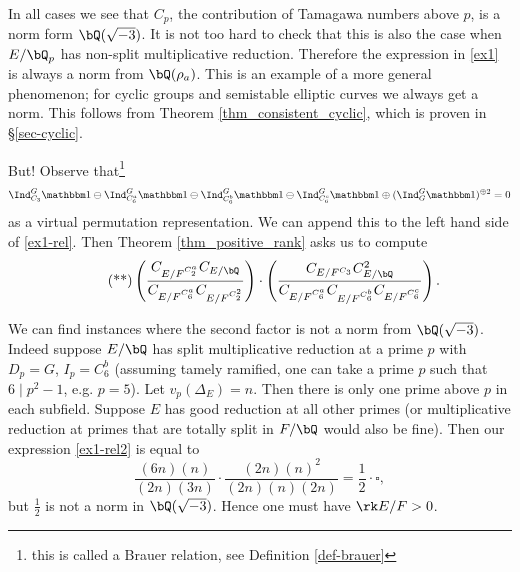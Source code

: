\begin{example}
    In all cases we see that $C_p$, the contribution of Tamagawa numbers above $p$, is a norm form $\bQ(\sqrt{-3})$. It is not too hard to check that this is also the case when $E / \bQ_p$ has non-split multiplicative reduction. Therefore the expression in \eqref{ex1} is always a norm from $\bQ(\rho_a)$. This is an example of a more general phenomenon; for cyclic groups and semistable elliptic curves we always get a norm. This follows from  Theorem \ref{thm_consistent_cyclic}, which is proven in \S\ref{sec-cyclic}.

    But! Observe that{\footnote{this is called a Brauer relation, see Definition \ref{def-brauer}}} 
    \[ \Ind_{C_3}^G \trivial \ominus \Ind_{C_6^a}^G \trivial \ominus \Ind_{C_6^b}^G \trivial \ominus \Ind_{C_6^c}^G \trivial \oplus (\Ind_G^G \trivial)^{\oplus 2} = 0 \]
    as a virtual permutation representation. We can append this to the left hand side of \eqref{ex1-rel}. Then Theorem \ref{thm_positive_rank} asks us to compute 
    \begin{equation}\label{ex1-rel2}\tag{**}
    \left(\frac{C_{E / F^{C_2^a}} C_{E / \bQ} }{C_{E / F^{C_6^a}} C_{E / F^{C_2^2}}}\right) \cdot \left( \frac{C_{E / F^{C_3}} C_{E / \bQ}^2}{C_{E / F^{C_6^a}}C_{E / F^{C_6^b}}  C_{E / F^{C_6^c}} } \right). 
    \end{equation}
    
    We can find instances where the second factor is not a norm from $\bQ(\sqrt{-3})$. Indeed suppose $E / \bQ$ has split multiplicative reduction at a prime $p$ with $D_p = G$, $I_p = C_6^b$ (assuming tamely ramified, one can take a prime $p$ such that $6 \mid p^2 - 1$, e.g. $p = 5$). Let $v_p(\Delta_E) = n$. Then there is only one prime above $p$ in each subfield. Suppose $E$ has good reduction at all other primes (or multiplicative reduction at primes that are totally split in $F / \bQ$ would also be fine).
     Then our expression \eqref{ex1-rel2} is equal to
     \[ \frac{(6n)(n)}{(2n) (3n)} \cdot \frac{(2n)(n)^2}{(2n)(n)(2n)} = \frac{1}{2} \cdot \square,\] 
     but $\frac{1}{2}$ is not a norm in $\bQ(\sqrt{-3})$. Hence one must have $\rk E / F > 0$. 
\end{example}

